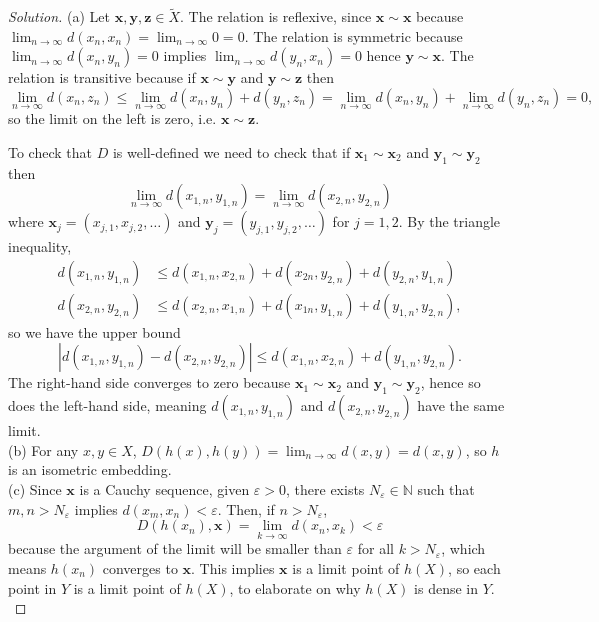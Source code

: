 \documentclass[10pt]{article}
\providecommand{\eps}{\varepsilon}
\providecommand{\NN}{\mathbb N}
\providecommand{\mb}[1]{\mathbf{#1}}
\newenvironment{soln}{\begin{proof}[Solution]}{\end{proof}}
\providecommand{\abs}[1]{\left\lvert #1\right\rvert}
\begin{document}
\begin{soln}
    (a) Let $\mb x,\mb y,\mb z\in\tilde X$.
    The relation is reflexive, since $\mb x\sim\mb x$ because
    $\lim_{n\to\infty} d(x_n,x_n) = \lim_{n\to\infty} 0 = 0$.
    The relation is symmetric because
    $\lim_{n\to\infty}d(x_n,y_n) = 0$ implies $\lim_{n\to\infty} d(y_n,x_n) = 0$
    hence $\mb y\sim\mb x$.
    The relation is transitive because if $\mb x\sim\mb y$
    and $\mb y\sim\mb z$ then
    \begin{equation*}
	\lim_{n\to\infty} d(x_n,z_n)
	\le \lim_{n\to\infty} d(x_n,y_n) + d(y_n,z_n)
	= \lim_{n\to\infty}d(x_n,y_n) + \lim_{n\to\infty}d(y_n,z_n) = 0,
    \end{equation*}
    so the limit on the left is zero, i.e. $\mb x\sim\mb z$.

    To check that $D$ is well-defined we need to check that
    if $\mb x_1\sim\mb x_2$ and $\mb y_1\sim\mb y_2$ then
    \begin{equation*}
	\lim_{n\to\infty}d(x_{1,n},y_{1,n})
	= \lim_{n\to\infty}d(x_{2,n},y_{2,n})
    \end{equation*}
    where $\mb x_j = (x_{j,1}, x_{j,2}, \dots)$
    and $\mb y_j = (y_{j,1}, y_{j,2}, \dots)$ for $j=1,2$.
    By the triangle inequality,
    \begin{align*}
	d(x_{1,n},y_{1,n}) &\le
	d(x_{1,n},x_{2,n}) + d(x_{2n},y_{2,n}) + d(y_{2,n},y_{1,n})\\
	d(x_{2,n},y_{2,n}) &\le
	d(x_{2,n},x_{1,n}) + d(x_{1n},y_{1,n}) + d(y_{1,n},y_{2,n}),
    \end{align*}
    so we have the upper bound
    \begin{equation*}
	\abs{d(x_{1,n},y_{1,n}) - d(x_{2,n},y_{2,n})}
	\le d(x_{1,n},x_{2,n}) + d(y_{1,n},y_{2,n}).
    \end{equation*}
    The right-hand side converges to zero because $\mb x_1\sim\mb x_2$
    and $\mb y_1\sim\mb y_2$, hence so does the left-hand side,
    meaning $d(x_{1,n},y_{1,n})$ and $d(x_{2,n},y_{2,n})$ have the same limit.
    \\

    (b) For any $x,y\in X$,
    $D(h(x), h(y)) = \lim_{n\to\infty} d(x,y) = d(x,y)$,
    so $h$ is an isometric embedding.
    \\

    (c) Since $\mb x$ is a Cauchy sequence,
    given $\eps>0$, there exists $N_\eps\in\NN$ such that $m,n>N_\eps$ implies
    $d(x_m,x_n) < \eps$. Then, if $n > N_\eps$,
    \begin{equation*}
	D(h(x_n), \mb x) = \lim_{k\to\infty} d(x_n,x_k) < \eps
    \end{equation*}
    because the argument of the limit will be smaller than $\eps$
    for all $k > N_\eps$, which means $h(x_n)$ converges to $\mb x$.
    This implies $\mb x$ is a limit point of $h(X)$,
    so each point in $Y$ is a limit point of $h(X)$,
    to elaborate on why $h(X)$ is dense in $Y$.
    \\


\end{soln}
\end{document}
